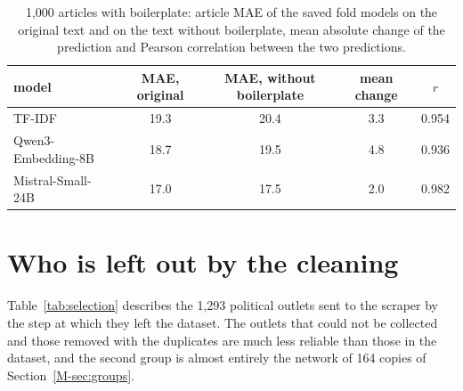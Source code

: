 \documentclass[11pt,a4paper]{article}
\begin{document}
\begin{table}[h]
\centering
\caption{1,000 articles with boilerplate: article MAE of the saved fold models on the original text and on the text
without boilerplate, mean absolute change of the prediction and Pearson correlation between the two predictions.}
\label{tab:reading}
\begin{tabular}{lcccc}
\toprule
model & MAE, original & MAE, without boilerplate & mean change & $r$ \\
\midrule
TF-IDF & 19.3 & 20.4 & 3.3 & 0.954 \\
Qwen3-Embedding-8B & 18.7 & 19.5 & 4.8 & 0.936 \\
Mistral-Small-24B & 17.0 & 17.5 & 2.0 & 0.982 \\
\bottomrule
\end{tabular}
\end{table}

\section{Who is left out by the cleaning}\label{app:selection}
Table~\ref{tab:selection} describes the 1,293 political outlets sent to the scraper by the step at which they left the
dataset. The outlets that could not be collected and those removed with the duplicates are much less reliable than those
in the dataset, and the second group is almost entirely the network of 164 copies of Section~\ref{M-sec:groups}.

\begin{table}[h]
\centering
\caption{The political outlets by the step at which they left the dataset: number, mean NewsGuard score, share in each
level, share by orientation and share based in the United States (\%).}\label{tab:selection}
\end{table}
\end{document}
